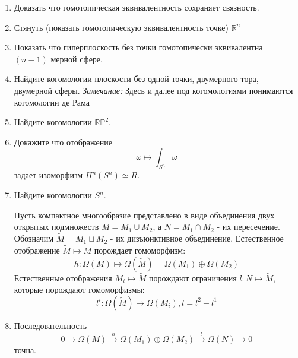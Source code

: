 \documentclass{article}
\newtheorem{theorem}{Th}
\begin{document}
\begin{enumerate}
 		\begin{theorem}[Пуанкаре]
 			Любая замкнутая форма $\omega \in \Omega^p(G)$ в звездной области $G$ точна.
 		\end{theorem}
 		Назовём отображения $g,f: X \mapsto Y$ гомотопными если существует отображение $F: X \times [0,1] \mapsto Y$, такое что $F(x,0) = f(x)$, $F(x,1) = g(x)$.
 		
 		Многообразия $X$ и $Y$ называются гомотопически эквивалентными, если существуют гладкие отображение $f: X \mapsto Y$ и $g: Y \mapsto X$, такие, что их композиции гомотопны тождественным отображениям.
 		
 		\vspace{3ex}
 		\item Доказать что гомотопическая эквивалентность сохраняет связность.
 		\item Стянуть (показать гомотопическую эквивалентность точке) $\mathbb{R}^n$
 		\item Показать что гиперплоскость без точки гомотопически эквивалентна $(n-1)$ мерной сфере.
 		
 		\item Найдите когомологии плоскости без одной точки, двумерного тора, двумерной сферы.  \textit{Замечание:} Здесь и далее под когомологиями понимаются когомологии де Рама
 		\item Найдите когомологии $\mathbb{RP}^2$.
 		\item Докажите что отображение 
 		$$ \omega \mapsto \int_{S^n} \omega$$
 		задает изоморфизм $H^n(S^n) \simeq R$.
 		\item Найдите когомологии $S^n$.
 		
 		\vspace{3ex}
 		Пусть компактное многообразие представлено в виде объединения двух открытых подмножеств $M = M_1 \cup M_2$, а $N= M_1 \cap M_2$ - их пересечение. Обозначим $\widetilde M = M_1 \sqcup M_2$ - их дизъюнктивное объединение. 
 		Естественное отображение $\widetilde M \mapsto M$ порождает гомоморфизм:
 		$$h: \Omega(M) \mapsto \Omega(\widetilde M) = \Omega (M_1) \oplus \Omega (M_2)$$
 		Естественные отображения $M_i \mapsto \widetilde M$ порождают ограничения $l: N \mapsto \widetilde M$, которые порождают гомоморфизмы:
 		$$l^i: \Omega(\widetilde M) \mapsto \Omega(M_i), l = l^2 - l^1$$
 		
 		\item Последовательность        $$0 \longrightarrow \Omega(M) \stackrel{h} {\longrightarrow} \Omega(M_1)  \oplus \Omega(M_2)  \stackrel{l}{\longrightarrow} \Omega(N) \longrightarrow 0 $$ точна.
 		
 		
 		
 	\end{enumerate}
 	\vspace{\fill}
 	
 	
 	
 
\end{document}
